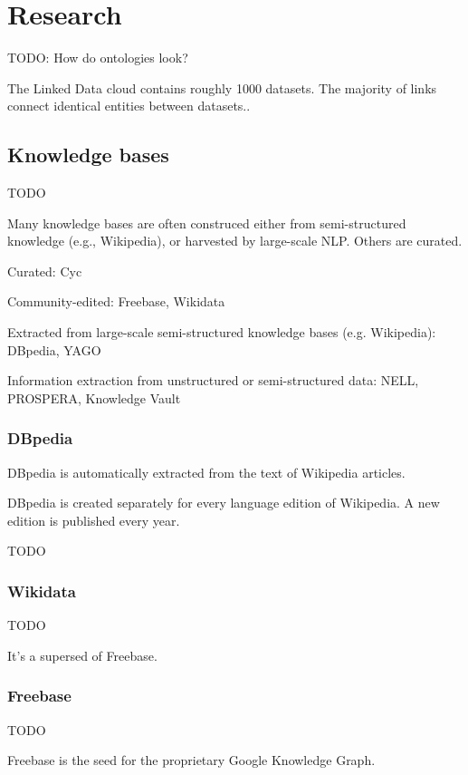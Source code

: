 \chapter{Research}

TODO: How do ontologies look?

The Linked Data cloud contains roughly 1000 datasets. The majority of links
connect identical entities between datasets.\cite{kg-refinement-survey}.

\section{Knowledge bases}

TODO

Many knowledge bases are often construced either from semi-structured knowledge
(e.g., Wikipedia), or harvested by large-scale NLP. Others are curated.

Curated: Cyc

Community-edited: Freebase, Wikidata

Extracted from large-scale semi-structured knowledge bases (e.g. Wikipedia):
DBpedia, YAGO

Information extraction from unstructured or semi-structured data: NELL,
PROSPERA, Knowledge Vault

\subsection{DBpedia}

DBpedia is automatically extracted from the text of Wikipedia articles.

DBpedia is created separately for every language edition of Wikipedia.
A new edition is published every year.

TODO

\subsection{Wikidata}

TODO

It's a supersed of Freebase.

\subsection{Freebase}

TODO

Freebase is the seed for the proprietary Google Knowledge
Graph\cite{kg-refinement-survey}.

